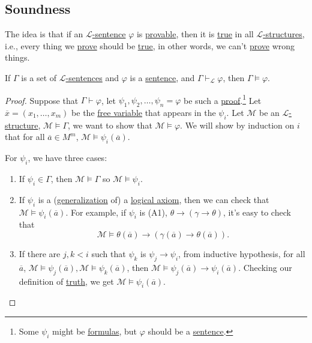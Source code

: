 \subsection{Soundness}
The idea is that if an \hyperref[def:sentence]{\(\mathcal{L} \)-sentence} \(\varphi \) is \hyperref[def:proof]{provable}, then it is \hyperref[def:truth]{true} in all \hyperref[def:structure]{\(\mathcal{L} \)-structures}, i.e., every thing we \hyperref[def:proof]{prove} should be \hyperref[def:truth]{true}, in other words, we can't \hyperref[def:proof]{prove} wrong things.

\begin{theorem}[Soundness]\label{thm:soundness}
	If \(\Gamma \) is a set of \hyperref[def:sentence]{\(\mathcal{L} \)-sentences} and \(\varphi \) is a \hyperref[def:sentence]{sentence}, and \(\Gamma \vdash _{\mathcal{L} } \varphi \), then \(\Gamma \models \varphi \).
\end{theorem}
\begin{proof}
	Suppose that \(\Gamma \vdash \varphi \), let \(\psi _1, \psi _2, \ldots , \psi _n = \varphi \) be such a \hyperref[def:proof]{proof}.\footnote{Some \(\psi _i\) might be \hyperref[def:formula]{formulas}, but \(\varphi \) should be a \hyperref[def:sentence]{sentence}.} Let \(\overline{x} = (x_1, \ldots , x_m)\) be the \hyperref[def:free-variable]{free variable} that appears in the \(\psi _i\). Let \(\mathcal{M} \) be an \hyperref[def:structure]{\(\mathcal{L} \)-structure}, \(\mathcal{M} \models \Gamma \), we want to show that \(\mathcal{M} \models \varphi \). We will show by induction on \(i\) that for all \(\overline{a} \in M^m\), \(\mathcal{M} \models \psi _i(\overline{a} )\).

	For \(\psi _i\), we have three cases:
	\begin{enumerate}[(1)]
		\item If \(\psi _i\in \Gamma \), then \(\mathcal{M} \models \Gamma \) so \(\mathcal{M} \models \psi _i\).
		\item If \(\psi _i\) is a (\hyperref[def:generalization]{generalization} of) a \hyperref[def:logical-axioms]{logical axiom}, then we can check that \(\mathcal{M} \models \psi _i(\overline{a} )\). For example, if \(\psi _i\) is (A1), \(\theta \to (\gamma \to \theta )\), it's easy to check that
		      \[
			      \mathcal{M} \models \theta (\overline{a} ) \to  (\gamma (\overline{a} ) \to \theta (\overline{a} )).
		      \]
		\item If there are \(j, k < i\) such that \(\psi _k\) is \(\psi _j \to \psi _i\), from inductive hypothesis, for all \(\overline{a} \), \(\mathcal{M} \models \psi _j(\overline{a} ), \mathcal{M} \models \psi _k(\overline{a} )\), then \(\mathcal{M} \models \psi _j(\overline{a} ) \to \psi _i(\overline{a} )\). Checking our definition of \hyperref[def:truth]{truth}, we get \(\mathcal{M} \models \psi _i(\overline{a} )\).
	\end{enumerate}
\end{proof}

